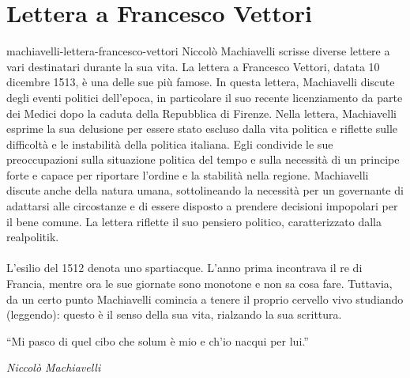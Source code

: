 \documentclass[preview]{standalone}
\begin{document}
\genpage

\section{Lettera a Francesco Vettori}

\begin{snippet}{machiavelli-lettera-francesco-vettori}
    Niccolò Machiavelli scrisse diverse lettere a vari destinatari durante la sua vita. La lettera a Francesco Vettori, datata 10 dicembre 1513, è una delle sue più famose. In questa lettera, Machiavelli discute degli eventi politici dell'epoca, in particolare il suo recente licenziamento da parte dei Medici dopo la caduta della Repubblica di Firenze.
    Nella lettera, Machiavelli esprime la sua delusione per essere stato escluso dalla vita politica e riflette sulle difficoltà e le instabilità della politica italiana. Egli condivide le sue preoccupazioni sulla situazione politica del tempo e sulla necessità di un principe forte e capace per riportare l'ordine e la stabilità nella regione.
    Machiavelli discute anche della natura umana, sottolineando la necessità per un governante di adattarsi alle circostanze e di essere disposto a prendere decisioni impopolari per il bene comune. La lettera riflette il suo pensiero politico, caratterizzato dalla realpolitik.
    \\\\
    L'esilio del 1512 denota uno spartiacque.
    L'anno prima incontrava il re di Francia, mentre ora
    le sue giornate sono monotone e non sa cosa fare.
    Tuttavia, da un certo punto Machiavelli comincia a tenere il proprio cervello vivo
    studiando (leggendo): questo è il senso della sua vita,
    rialzando la sua scrittura.

    \epigraph{``Mi pasco di quel cibo che solum è mio e ch'io nacqui per lui.''}{\textit{Niccolò Machiavelli}}


\end{snippet}
\end{document}
